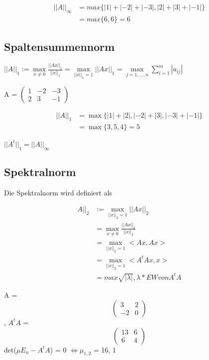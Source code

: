 \documentclass[12pt,a4paper]{article} %
\begin{document}
	\begin{equation*}
		\begin{split}		
			||A||_\infty & = max\{|1| + |-2| + |-3|, |2| + |3| + |-1|\} \\
			& = max\{6, 6\} = 6
		\end{split}
	\end{equation*}
	
	\subsection{Spaltensummennorm}
	
	$||A||_1 := \max\limits_{x \ne 0} \frac{||Ax||_1}{||x||_1} = \max\limits_{||x||_1 = 1} ||Ax||_1 = \max\limits_{j = 1, ..., n} \sum\limits_{i = 1}^{m}|a_{ij}|$
	
	A = 
	$\begin{pmatrix}
		1 & -2 & -3 \\
		2 & 3 & -1
	\end{pmatrix}$
	
	\begin{equation*}
		\begin{split}		
			||A||_1 & = \max\{|1| + |2|, |-2| + |3|, |-3| + |-1|\}  \\
			& = \max\{3, 5, 4\} = 5
		\end{split}
	\end{equation*}
	
	$||A^t||_1 = ||A||_\infty$
	
	\subsection{Spektralnorm}
	
	Die Spektralnorm wird definiert als
	
	\begin{equation*}
		\begin{split}
			A||_2 &:= \max\limits_{||x||_2 = 1} ||Ax||_2 \\
			&= \max\limits_{x \ne 0} \frac{||Ax||_2}{||x||_2} \\
			&= \max\limits_{||x||_2 = 1} <Ax, Ax> \\
			&= \max\limits_{||x||_2 = 1} <A^tAx, x> \\
			&= max{\sqrt{|\lambda |}, \lambda * EW von A^tA}
		\end{split}
	\end{equation*}
	
	A = 
	\begin{equation*}
		\begin{pmatrix}
			3 & 2 \\
			-2 & 0 
		\end{pmatrix}
	\end{equation*}
	, $A^tA$ = 
	\begin{equation*}
		\begin{pmatrix}
			13 & 6 \\
			6 & 4 
		\end{pmatrix}
	\end{equation*}
	det($\mu E_n - A^tA$) = 0 $\Leftrightarrow \mu_{1, 2}$ = {16, 1}
	
\end{document}

